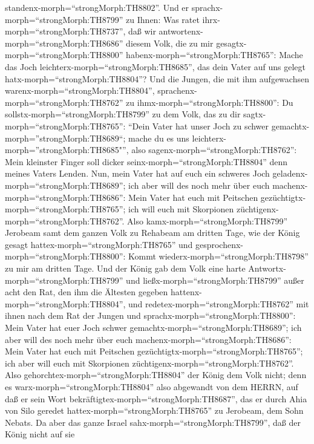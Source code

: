 standenx-morph=``strongMorph:TH8802''.  Und er
sprachx-morph=``strongMorph:TH8799'' zu Ihnen: Was ratet
ihrx-morph=``strongMorph:TH8737'', daß wir
antwortenx-morph=``strongMorph:TH8686'' diesem Volk, die zu mir
gesagtx-morph=``strongMorph:TH8800''
habenx-morph=``strongMorph:TH8765'': Mache das Joch
leichterx-morph=``strongMorph:TH8685'', das dein Vater auf uns gelegt
hatx-morph=``strongMorph:TH8804''?  Und die Jungen, die mit
ihm aufgewachsen warenx-morph=``strongMorph:TH8804'',
sprachenx-morph=``strongMorph:TH8762'' zu
ihmx-morph=``strongMorph:TH8800'': Du
sollstx-morph=``strongMorph:TH8799'' zu dem Volk, das zu dir
sagtx-morph=``strongMorph:TH8765'': ``Dein Vater hat unser Joch zu
schwer gemachtx-morph=''strongMorph:TH8689``; mache du es uns
leichterx-morph=''strongMorph:TH8685"'', also
sagenx-morph=``strongMorph:TH8762'': Mein kleinster Finger soll dicker
seinx-morph=``strongMorph:TH8804'' denn meines Vaters Lenden.
 Nun, mein Vater hat auf euch ein schweres Joch
geladenx-morph=``strongMorph:TH8689''; ich aber will des noch mehr über
euch machenx-morph=``strongMorph:TH8686'': Mein Vater hat euch mit
Peitschen gezüchtigtx-morph=``strongMorph:TH8765''; ich will euch mit
Skorpionen züchtigenx-morph=``strongMorph:TH8762''.  Also
kamx-morph=``strongMorph:TH8799'' Jerobeam samt dem ganzen Volk zu
Rehabeam am dritten Tage, wie der König gesagt
hattex-morph=``strongMorph:TH8765'' und
gesprochenx-morph=``strongMorph:TH8800'': Kommt
wiederx-morph=``strongMorph:TH8798'' zu mir am dritten Tage.
 Und der König gab dem Volk eine harte
Antwortx-morph=``strongMorph:TH8799'' und
ließx-morph=``strongMorph:TH8799'' außer acht den Rat, den ihm die
Ältesten gegeben hattenx-morph=``strongMorph:TH8804'',  und
redetex-morph=``strongMorph:TH8762'' mit ihnen nach dem Rat der Jungen
und sprachx-morph=``strongMorph:TH8800'': Mein Vater hat euer Joch
schwer gemachtx-morph=``strongMorph:TH8689''; ich aber will des noch
mehr über euch machenx-morph=``strongMorph:TH8686'': Mein Vater hat euch
mit Peitschen gezüchtigtx-morph=``strongMorph:TH8765''; ich aber will
euch mit Skorpionen züchtigenx-morph=``strongMorph:TH8762''.
 Also gehorchtex-morph=``strongMorph:TH8804'' der König dem
Volk nicht; denn es warx-morph=``strongMorph:TH8804'' also abgewandt von
dem HERRN, auf daß er sein Wort
bekräftigtex-morph=``strongMorph:TH8687'', das er durch Ahia von Silo
geredet hattex-morph=``strongMorph:TH8765'' zu Jerobeam, dem Sohn
Nebats.  Da aber das ganze Israel
sahx-morph=``strongMorph:TH8799'', daß der König nicht auf sie
